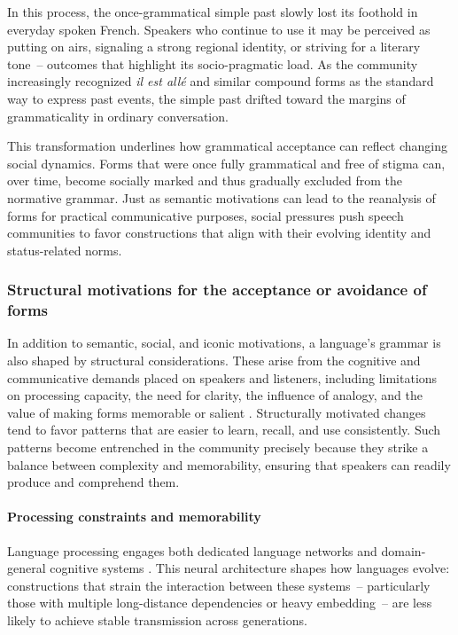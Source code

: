 \documentclass[12pt,letterpaper]{article}
\begin{document}
In this process, the once-grammatical simple past slowly lost its foothold in everyday spoken French. Speakers who continue to use it may be perceived as putting on airs, signaling a strong regional identity, or striving for a literary tone~-- outcomes that highlight its socio-pragmatic load. As the community increasingly recognized \textit{il est allé} and similar compound forms as the standard way to express past events, the simple past drifted toward the margins of grammaticality in ordinary conversation.

This transformation underlines how grammatical acceptance can reflect changing social dynamics. Forms that were once fully grammatical and free of stigma can, over time, become socially marked and thus gradually excluded from the normative grammar. Just as semantic motivations can lead to the reanalysis of forms for practical communicative purposes, social pressures push speech communities to favor constructions that align with their evolving identity and status-related norms.

\subsubsection{Structural motivations for the acceptance or avoidance of forms}\label{subsec:structural-motivations}

In addition to semantic, social, and iconic motivations, a language’s grammar is also shaped by structural considerations. These arise from the cognitive and communicative demands placed on speakers and listeners, including limitations on processing capacity, the need for clarity, the influence of analogy, and the value of making forms memorable or salient \autocite{wurzel1989}. Structurally motivated changes tend to favor patterns that are easier to learn, recall, and use consistently. Such patterns become entrenched in the community precisely because they strike a balance between complexity and memorability, ensuring that speakers can readily produce and comprehend them.

\paragraph{Processing constraints and memorability}\label{sec:processing}
Language processing engages both dedicated language networks and domain-general cognitive systems \autocite{Fedorenko2024}. This neural architecture shapes how languages evolve: constructions that strain the interaction between these systems~-- particularly those with multiple long-distance dependencies or heavy embedding~-- are less likely to achieve stable transmission across generations.
\end{document}
